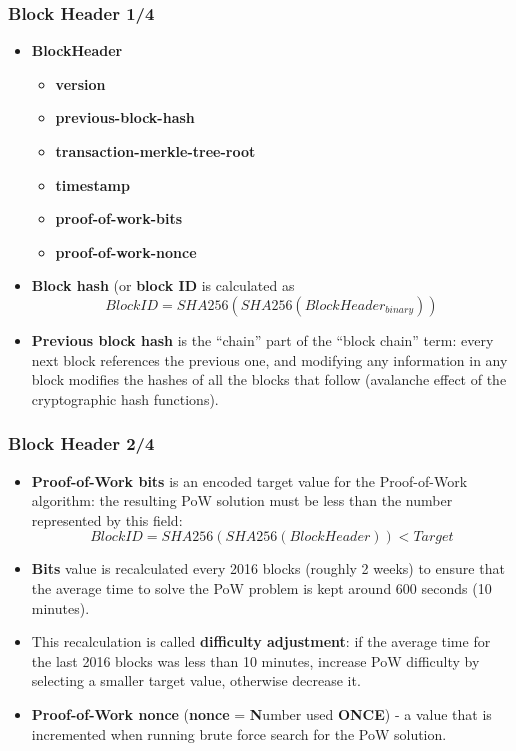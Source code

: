 \documentclass{beamer}
\begin{document}
\begin{frame}
  \frametitle{Block Header 1/4}
  \begin{itemize}
  \item \textbf{BlockHeader}
    \begin{itemize}
    \item \textbf{version}
    \item \textbf{previous-block-hash}
    \item \textbf{transaction-merkle-tree-root}
    \item \textbf{timestamp}
    \item \textbf{proof-of-work-bits}
    \item \textbf{proof-of-work-nonce}
    \end{itemize}
  \item \textbf{Block hash} (or \textbf{block ID} is calculated as
    $$BlockID = SHA256(SHA256(BlockHeader_{binary}))$$
  \item \textbf{Previous block hash} is the ``chain'' part of the ``block
    chain'' term: every next block references the previous one, and modifying
    any information in any block modifies the hashes of all the blocks that
    follow (avalanche effect of the cryptographic hash functions).
  \end{itemize}
\end{frame}

\begin{frame}
  \frametitle{Block Header 2/4}
  \begin{itemize}
  \item \textbf{Proof-of-Work bits} is an encoded target value for the
    Proof-of-Work algorithm: the resulting PoW solution must be less than the
    number represented by this field:
    $$ BlockID = SHA256(SHA256(BlockHeader)) < Target$$
  \item \textbf{Bits} value is recalculated every 2016 blocks (roughly 2 weeks)
    to ensure that the average time to solve the PoW problem is kept around 600
    seconds (10 minutes).
  \item This recalculation is called \textbf{difficulty adjustment}: if the
    average time for the last 2016 blocks was less than 10 minutes, increase PoW
    difficulty by selecting a smaller target value, otherwise decrease it.
  \item \textbf{Proof-of-Work nonce} (\textbf{nonce} = \textbf{N}umber used
    \textbf{ONCE}) - a value that is incremented when running brute force search
    for the PoW solution.
  \end{itemize}
\end{frame}
\end{document}
